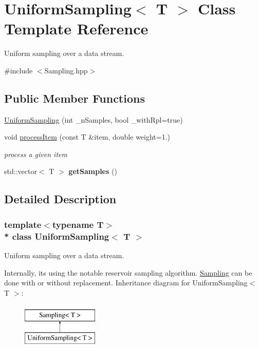 \hypertarget{classUniformSampling}{}\section{Uniform\+Sampling$<$ T $>$ Class Template Reference}
\label{classUniformSampling}


Uniform sampling over a data stream.  




{\ttfamily \#include $<$Sampling.\+hpp$>$}

\subsection*{Public Member Functions}
\begin{DoxyCompactItemize}
\item 
\hyperlink{classUniformSampling_aa2d2dbe301e4156142c670448ad5dbaf}{Uniform\+Sampling} (int \+\_\+n\+Samples, bool \+\_\+with\+Rpl=true)
\item 
void \hyperlink{classUniformSampling_a53155f91000902128df0df27ef0b5255}{process\+Item} (const T \&item, double weight=1.)
\begin{DoxyCompactList}\small\item\em process a given item \end{DoxyCompactList}\item 
std\+::vector$<$ T $>$ {\bfseries get\+Samples} ()\hypertarget{classUniformSampling_a29211c5698ab1c326332d02c509ca488}{}\label{classUniformSampling_a29211c5698ab1c326332d02c509ca488}

\end{DoxyCompactItemize}


\subsection{Detailed Description}
\subsubsection*{template$<$typename T$>$\\*
class Uniform\+Sampling$<$ T $>$}

Uniform sampling over a data stream. 

Internally, it\textquotesingle{}s using the notable {\ttfamily reservoir sampling} algorithm. \hyperlink{classSampling}{Sampling} can be done with or without replacement. Inheritance diagram for Uniform\+Sampling$<$ T $>$\+:\begin{figure}[H]
\begin{center}
\leavevmode
\includegraphics[height=2.000000cm]{classUniformSampling}
\end{center}
\end{figure}



